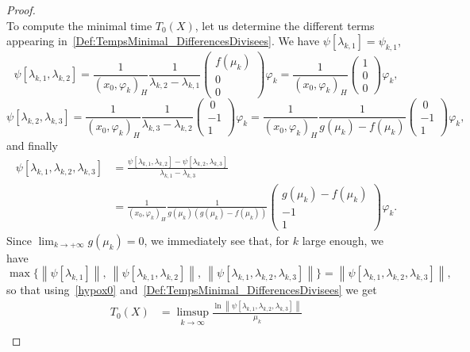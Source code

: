 \documentclass[AHL,Unicode,longabstracts]{cedram}
\newcommand{\normeX}[1]{\left\| #1 \right\|}
\newcommand{\psH}[2]{\left(#1, #2 \right)_H}
\begin{document}
\begin{proof}
\[\]
To compute the minimal time $T_0(X)$, let us determine the different terms appearing in~\eqref{Def:TempsMinimal_DifferencesDivisees}. We have $\psi[\lambda_{k,1}]=\psi_{k,1}$,
\[
\psi[\lambda_{k,1}, \lambda_{k,2}] = \frac{1}{\psH{x_0}{\varphi_k}} \frac{1}{\lambda_{k,2}-\lambda_{k,1}}
\begin{pmatrix}
f(\mu_k) \\ 0 \\ 0
\end{pmatrix} \varphi_k = \frac{1}{\psH{x_0}{\varphi_k}}
\begin{pmatrix}
1 \\ 0 \\ 0
\end{pmatrix} \varphi_k,
\]
\[
\psi[\lambda_{k,2}, \lambda_{k,3}] = \frac{1}{\psH{x_0}{\varphi_k}} \frac{1}{\lambda_{k,3}-\lambda_{k,2}}
\begin{pmatrix}
\ 0\\-1\\1
\end{pmatrix} \varphi_k
= \frac{1}{\psH{x_0}{\varphi_k}} \frac{1}{g(\mu_k) - f(\mu_k)}
\begin{pmatrix}
\ 0\\-1\\1
\end{pmatrix} \varphi_k,
\]
and finally
\begin{align*}
\psi[\lambda_{k,1},\lambda_{k,2},\lambda_{k,3}] &= \frac{\psi[\lambda_{k,1},\lambda_{k,2}]-\psi[\lambda_{k,2},\lambda_{k,3}]}{\lambda_{k,1}-\lambda_{k,3}}
\\
&= \frac{1}{\psH{x_0}{\varphi_k}} \frac{1}{g(\mu_k) \left(g(\mu_k)-f(\mu_k) \right)}
\begin{pmatrix} g(\mu_k)-f(\mu_k) \\ -1 \\ 1
\end{pmatrix} \varphi_k.
\end{align*}
Since $\lim_{k\to +\infty} g(\mu_k)=0$, we immediately see that, for $k$ large enough, we have
\[
\max \big\{ \normeX{\psi[\lambda_{k,1}]}, \: \normeX{\psi[\lambda_{k,1},\lambda_{k,2}]}, \: \normeX{\psi[\lambda_{k,1},\lambda_{k,2},\lambda_{k,3}]} \big\} = \normeX{\psi[\lambda_{k,1},\lambda_{k,2},\lambda_{k,3}]},
\]
so that using~\eqref{hypox0} and~\eqref{Def:TempsMinimal_DifferencesDivisees} we get
\begin{equation}\label{T0_fg}
\begin{aligned}
T_0(X) &= \limsup_{k \to \infty} \frac{ \ln \normeX{ \psi[\lambda_{k,1}, \lambda_{k,2}, \lambda_{k,3}]} }{\mu_k} \\

\end{aligned}
\end{equation}
\end{proof}
\end{document}
